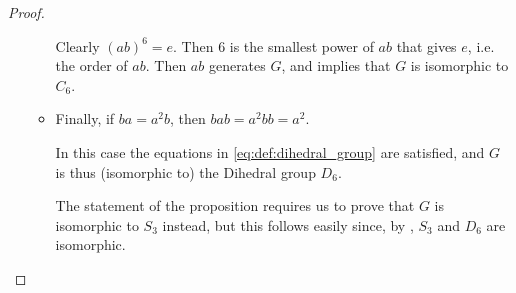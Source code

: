 \begin{proof}
\begin{itemize}
\begin{itemize}
      Clearly \( (ab)^6 = e \). Then \( 6 \) is the smallest power of \( ab \) that gives \( e \), i.e. the order of \( ab \). Then \( ab \) generates \( G \), and  implies that \( G \) is isomorphic to \( C_6 \).

      \item Finally, if \( ba = a^2 b \), then \( bab = a^2 bb = a^2 \).

      In this case the equations in \eqref{eq:def:dihedral_group} are satisfied, and \( G \) is thus (isomorphic to) the Dihedral group \( D_6 \).

      The statement of the proposition requires us to prove that \( G \) is isomorphic to \( S_3 \) instead, but this follows easily since, by , \( S_3 \) and \( D_6 \) are isomorphic.
    \end{itemize}
  \end{itemize}
\end{proof}
